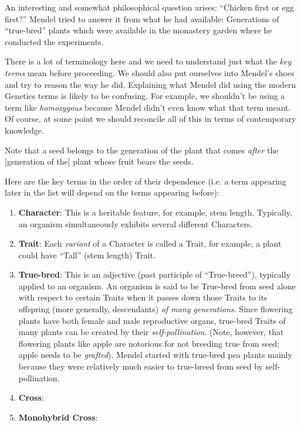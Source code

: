 \documentclass[12pt]{article}
\begin{document}
An interesting and somewhat philosophical question arises: ``Chicken first or egg first?'' Mendel tried to answer it from what he had available: Generations of ``true-bred'' plants which were available in the monastery garden where he conducted the experiments. 

There is a lot of terminology here and we need to understand just what the \emph{key terms} mean before proceeding. We should also put ourselves into Mendel's shoes and try to reason the way he did. Explaining what Mendel did using the modern Genetics terms is likely to be confusing. For example, we shouldn't be using a term like \emph{homozygous} because Mendel didn't even know what that term meant. Of course, at some point we should reconcile all of this in terms of contemporary knowledge. 

Note that a seed belongs to the generation of the plant that comes \emph{after} the [generation of the] plant whose fruit bears the seeds.

Here are the key terms in the order of their dependence (i.e. a term appearing later in the list will depend on the terms appearing before):
\begin{enumerate}
    \item \textbf{Character}: This is a heritable feature, for example, stem length. Typically, an organism simultaneously exhibits several different Characters.
    \item \textbf{Trait}: Each \emph{variant} of a Character is called a Trait, for example, a plant could have ``Tall'' (stem length) Trait.
    \item \textbf{True-bred}: This is an adjective (past participle of ``True-breed''), typically applied to an organism. An organism is said to be True-bred from seed alone with respect to certain Traits when it passes down those Traits to its offspring (more generally, descendants) \emph{of many generations}. Since flowering plants have both female and male reproductive organs, true-bred Traits of many plants can be created by their \emph{self-pollination}. (Note, however, that flowering plants like apple are notorious for not breeding true from seed; apple needs to be \emph{grafted}). Mendel started with true-bred pea plants mainly because they were relatively much easier to true-breed from seed by self-pollination.
    \item \textbf{Cross}:
    \item \textbf{Monohybrid Cross}: 
\end{enumerate}
\end{document}
